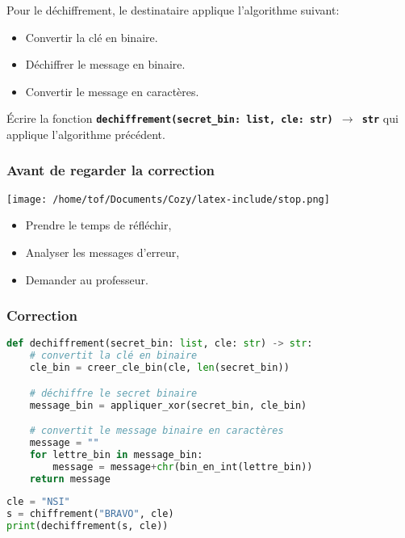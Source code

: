 \documentclass[svgnames,11pt]{beamer}
\begin{document}
\begin{frame}
    \frametitle{}

    Pour le déchiffrement, le destinataire applique l'algorithme suivant:
    \begin{itemize}
        \item Convertir la clé en binaire.
        \item Déchiffrer le message en binaire.
        \item Convertir le message en caractères.
    \end{itemize}
\begin{activite}
    Écrire la fonction \textbf{\texttt{dechiffrement(secret\_bin: list, cle: str) $\rightarrow$ str}} qui applique l'algorithme précédent.
\end{activite}
\end{frame}
\begin{frame}
    \frametitle{Avant de regarder la correction}
\begin{center}
    \centering
    \texttt{[image: /home/tof/Documents/Cozy/latex-include/stop.png]}
    \end{center}
{\Large
    \begin{itemize}
        \item Prendre le temps de réfléchir,
        \item Analyser les messages d'erreur,
        \item Demander au professeur.
    \end{itemize}
}
\end{frame}
\begin{frame}[fragile]
    \frametitle{Correction}

\begin{center}
\begin{lstlisting}[language=Python , basicstyle=\ttfamily\small, xleftmargin=0.2em, xrightmargin=-1em]
def dechiffrement(secret_bin: list, cle: str) -> str:
    # convertit la clé en binaire
    cle_bin = creer_cle_bin(cle, len(secret_bin))

    # déchiffre le secret binaire
    message_bin = appliquer_xor(secret_bin, cle_bin)

    # convertit le message binaire en caractères
    message = ""
    for lettre_bin in message_bin:
        message = message+chr(bin_en_int(lettre_bin))
    return message
\end{lstlisting}
\begin{lstlisting}[language=Python , basicstyle=\ttfamily\small, xleftmargin=0.2em, xrightmargin=-1em]
cle = "NSI"
s = chiffrement("BRAVO", cle)
print(dechiffrement(s, cle))
\end{lstlisting}
\end{center}

\end{frame}
\end{document}
